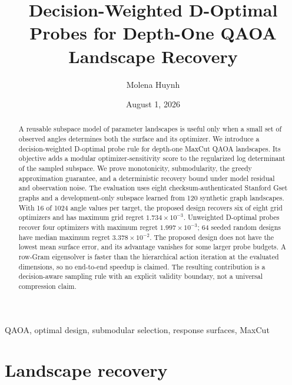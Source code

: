 \documentclass[10pt,letterpaper,twoside]{article}
\begin{document}
\title{Decision-Weighted D-Optimal Probes for Depth-One QAOA Landscape Recovery}
\author{Molena Huynh}
\date{August 1, 2026}

\maketitle

\begin{abstract}
A reusable subspace model of parameter landscapes is useful only when a small
set of observed angles determines both the surface and its optimizer.  We
introduce a decision-weighted D-optimal probe rule for depth-one MaxCut QAOA
landscapes.  Its objective adds a modular optimizer-sensitivity score to the
regularized log determinant of the sampled subspace.  We prove monotonicity,
submodularity, the greedy approximation guarantee, and a deterministic
recovery bound under model residual and observation noise.  The evaluation
uses eight checksum-authenticated Stanford Gset graphs and a development-only
subspace learned from 120 synthetic graph landscapes.  With 16 of 1024 angle
values per target, the proposed design recovers six of eight grid optimizers
and has maximum grid regret $1.734\times10^{-3}$.  Unweighted D-optimal probes
recover four optimizers with maximum regret $1.997\times10^{-3}$; 64 seeded
random designs have median maximum regret $3.378\times10^{-2}$.  The proposed
design does not have the lowest mean surface error, and its advantage vanishes
for some larger probe budgets.  A row-Gram eigensolver is faster than the
hierarchical action iteration at the evaluated dimensions, so no end-to-end
speedup is claimed.  The resulting contribution is a decision-aware sampling
rule with an explicit validity boundary, not a universal compression claim.
\end{abstract}

\begin{keywords}
QAOA, optimal design, submodular selection, response surfaces, MaxCut
\end{keywords}

\section{Landscape recovery}
\end{document}
